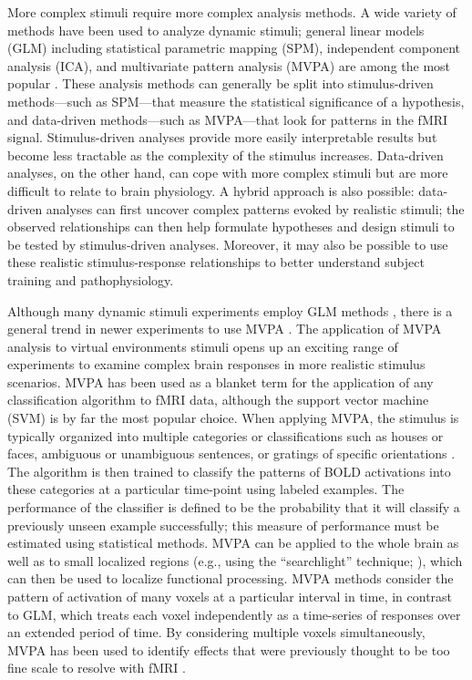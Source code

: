 \documentclass[5p,authoryear]{elsarticle}
\begin{document}
More complex stimuli require more complex analysis methods.
A wide variety of methods have been used to analyze dynamic stimuli; general linear models (GLM) including statistical parametric mapping (SPM), independent component analysis (ICA), and multivariate pattern analysis (MVPA) are among the most popular \citep{Spiers2007}.
These analysis methods can generally be split into stimulus-driven methods---such as SPM---that measure the statistical significance of a hypothesis, and data-driven methods---such as MVPA---that look for patterns in the fMRI signal.
Stimulus-driven analyses provide more easily interpretable results but become less tractable as the complexity of the stimulus increases.
Data-driven analyses, on the other hand, can cope with more complex stimuli but are more difficult to relate to brain physiology.
A hybrid approach is also possible: data-driven analyses can first uncover complex patterns evoked by realistic stimuli; the observed relationships can then help formulate hypotheses and design stimuli to be tested by stimulus-driven analyses. 
Moreover, it may also be possible to use these realistic stimulus-response relationships to better understand subject training and pathophysiology.

Although many dynamic stimuli experiments employ GLM methods \citep{Maguire1998,Calhoun2002,King2006,Mathiak2006,Spiers2007a}, there is a general trend in newer experiments to use MVPA \citep{Hassabis2009,Chadwick2010}. 
The application of MVPA analysis to virtual environments stimuli opens up an exciting range of experiments to examine complex brain responses in more realistic stimulus scenarios.
MVPA has been used as a blanket term for the application of any classification algorithm to fMRI data, although the support vector machine (SVM) is by far the most popular choice.
When applying MVPA, the stimulus is typically organized into multiple categories or classifications such as houses or faces, ambiguous or unambiguous sentences, or gratings of specific orientations \citep{Haxby2001,Mitchell2003,Haynes2006}.
The algorithm is then trained to classify the patterns of BOLD activations into these categories at a particular time-point using labeled examples.
The performance of the classifier is defined to be the probability that it will classify a previously unseen example successfully;
this measure of performance must be estimated using statistical methods.
MVPA can be applied to the whole brain as well as to small localized regions (e.g., using the ``searchlight'' technique; \cite{Kriegeskorte2006}), which can then be used to localize functional processing.
MVPA methods consider the pattern of activation of many voxels at a particular interval in time, in contrast to GLM, which treats each voxel independently as a time-series of responses over an extended period of time.
By considering multiple voxels simultaneously, MVPA has been used to identify effects that were previously thought to be too fine scale to resolve with fMRI \citep{Kamitani2005,Hassabis2009}.
\end{document}
